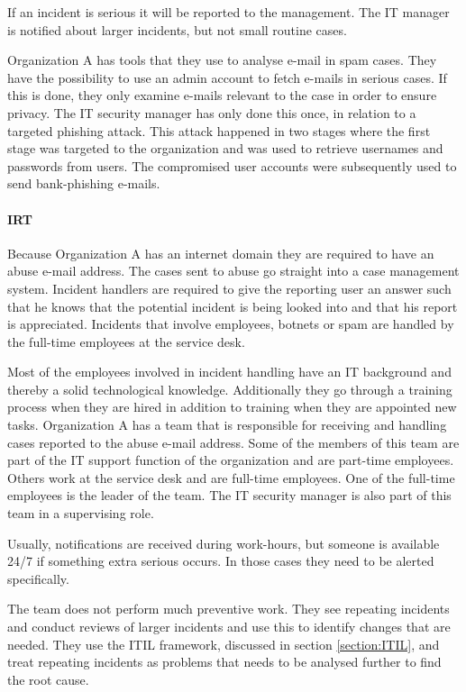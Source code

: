 If an incident is serious it will be reported to the management. The IT manager is notified about larger incidents, but not small routine cases.

Organization A has tools that they use to analyse e-mail in spam cases. They have the possibility to use an admin account to fetch e-mails in serious cases. If this is done, they only examine e-mails relevant to the case in order to ensure privacy. The IT security manager has only done this once, in relation to a targeted phishing attack. This attack happened in two stages where the first stage was targeted to the organization and was used to retrieve usernames and passwords from users. The compromised user accounts were subsequently used to send bank-phishing e-mails.

\paragraph{\acl{IRT}}
Because Organization A has an internet domain they are required to have an abuse e-mail address. The cases sent to abuse go straight into a case management system. Incident handlers are required to give the reporting user an answer such that he knows that the potential incident is being looked into and that his report is appreciated. Incidents that involve employees, botnets or spam are handled by the full-time employees at the service desk. 

Most of the employees involved in incident handling have an IT background and thereby a solid technological knowledge. Additionally they go through a training process when they are hired in addition to training when they are appointed new tasks. Organization A has a team that is responsible for receiving and handling cases reported to the abuse e-mail address. Some of the members of this team are part of the IT support function of the organization and are part-time employees. Others work at the service desk and are full-time employees. One of the full-time employees is the leader of the team. The IT security manager is also part of this team in a supervising role. 

Usually, notifications are received during work-hours, but someone is available 24/7 if something extra serious occurs. In those cases they need to be alerted specifically.

The team does not perform much preventive work. They see repeating incidents and conduct reviews of larger incidents and use this to identify changes that are needed. They use the \ac{ITIL} framework, discussed in section \ref{section:ITIL}, and treat repeating incidents as problems that needs to be analysed further to find the root cause.

